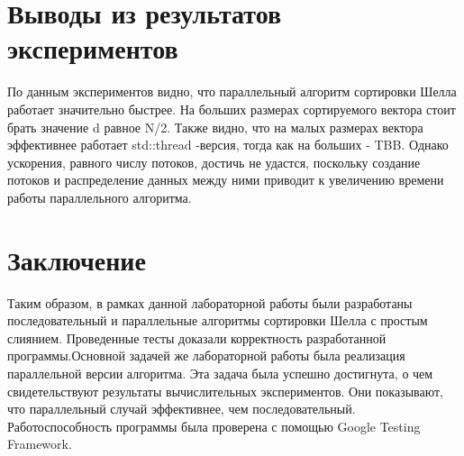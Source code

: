 \documentclass{report}
\begin{document}
\newpage

\section*{Выводы из результатов экспериментов}
По данным экспериментов видно, что параллельный алгоритм сортировки Шелла работает значительно быстрее. На больших размерах сортируемого вектора стоит брать значение d равное N/2. Также видно, что на малых размерах вектора эффективнее работает std::thread -версия, тогда как на больших - TBB. Однако ускорения, равного числу потоков, достичь не удастся, поскольку создание потоков и распределение данных между ними приводит к увеличению времени работы параллельного алгоритма.

\newpage

\section*{Заключение}
Таким образом, в рамках данной лабораторной работы были разработаны последовательный и параллельные алгоритмы сортировки Шелла с простым слиянием. Проведенные тесты доказали корректность разработанной программы.Основной задачей же лабораторной работы была реализация параллельной версии алгоритма. Эта задача была успешно достигнута, о чем свидетельствуют результаты вычислительных экспериментов. Они показывают, что параллельный случай эффективнее, чем последовательный.
Работоспособность программы была проверена с помощью Google Testing Framework.
\newpage

\end{document}
